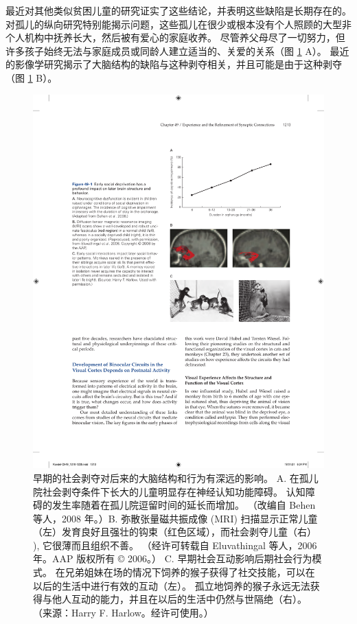 最近对其他类似贫困儿童的研究证实了这些结论，并表明这些缺陷是长期存在的。
对孤儿的纵向研究特别能揭示问题，这些孤儿在很少或根本没有个人照顾的大型非个人机构中抚养长大，然后被有爱心的家庭收养。
尽管养父母尽了一切努力，但许多孩子始终无法与家庭成员或同龄人建立适当的、关爱的关系（图 \ref{fig:49_1} A）。
最近的影像学研究揭示了大脑结构的缺陷与这种剥夺相关，并且可能是由于这种剥夺（图 \ref{fig:49_1} B）。


\begin{figure}[htbp]
	\centering
	\includegraphics[width=0.9\linewidth]{chap49/fig_49_1}
	\caption{早期的社会剥夺对后来的大脑结构和行为有深远的影响。 A. 在孤儿院社会剥夺条件下长大的儿童明显存在神经认知功能障碍。 认知障碍的发生率随着在孤儿院逗留时间的延长而增加。 （改编自 Behen 等人，2008 年。）B. 弥散张量磁共振成像 (MRI) 扫描显示正常儿童（左）发育良好且强壮的钩束（红色区域），而社会剥夺儿童（右） ), 它很薄而且组织不善。 （经许可转载自 Eluvathingal 等人，2006 年。AAP 版权所有 © 2006。） C. 早期社会互动影响后期社会行为模式。 在兄弟姐妹在场的情况下饲养的猴子获得了社交技能，可以在以后的生活中进行有效的互动（左）。 孤立地饲养的猴子永远无法获得与他人互动的能力，并且在以后的生活中仍然与世隔绝（右）。 （来源：Harry F. Harlow。经许可使用。）}
	\label{fig:49_1}
\end{figure}

